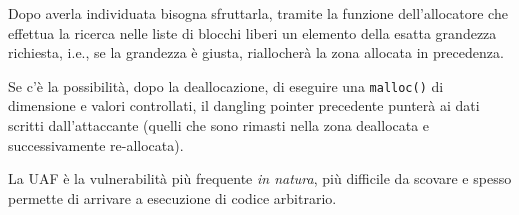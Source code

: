 Dopo averla individuata bisogna sfruttarla, tramite la funzione dell'allocatore che effettua la ricerca nelle liste di blocchi liberi un elemento della esatta grandezza richiesta, i.e., se la grandezza è giusta, riallocherà la zona allocata in precedenza.

Se c'è la possibilità, dopo la deallocazione, di eseguire una \texttt{malloc()} di dimensione e valori controllati, il dangling pointer precedente punterà ai dati scritti dall'attaccante (quelli che sono rimasti nella zona deallocata e successivamente re-allocata). 

La UAF è la vulnerabilità più frequente \textit{in natura}, più difficile da scovare e spesso permette di arrivare a esecuzione di codice arbitrario.

